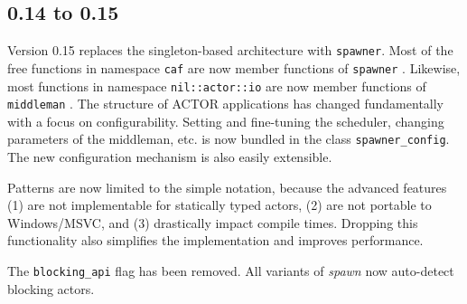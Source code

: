 \clearpage
\subsection{0.14 to 0.15}

Version 0.15 replaces the singleton-based architecture with
\lstinline^spawner^. Most of the free functions in namespace
\lstinline^caf^ are now member functions of \lstinline^spawner^
. Likewise, most functions in namespace \lstinline^nil::actor::io^
are now member functions of \lstinline^middleman^ . The
structure of ACTOR applications has changed fundamentally with a focus on
configurability. Setting and fine-tuning the scheduler, changing parameters of
the middleman, etc. is now bundled in the class
\lstinline^spawner_config^. The new configuration mechanism is also easily
extensible.

Patterns are now limited to the simple notation, because the advanced features
(1) are not implementable for statically typed actors, (2) are not portable to
Windows/MSVC, and (3) drastically impact compile times. Dropping this
functionality also simplifies the implementation and improves performance.

The \lstinline^blocking_api^ flag has been removed. All variants of
\emph{spawn} now auto-detect blocking actors.

